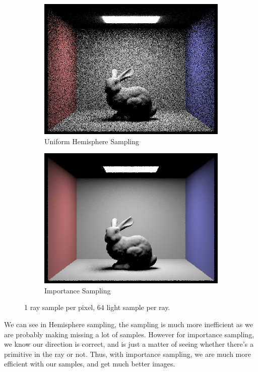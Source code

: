 \documentclass{article}
\begin{document}
\begin{figure}
\begin{subfigure}[h]{0.4\textwidth}
\includegraphics[width=\textwidth]{task3/CBbunny_1_64_h.png}
\caption{Uniform Hemisphere Sampling}
\end{subfigure}
\hfill\vrule\hfill
\begin{subfigure}[h]{0.4\textwidth}
\includegraphics[width=\textwidth]{task3/CBbunny_1_64.png}
\caption{Importance Sampling}
\end{subfigure}%

\caption[f2]{1 ray sample per pixel, 64 light sample per ray.}
\end{figure}
We can see in Hemisphere sampling, the sampling is much more inefficient as we are probably making missing a lot of samples. However for importance sampling, we know our direction is correct, and is just a matter of seeing whether there's a primitive in the ray or not. Thus, with importance sampling, we are much more efficient with our samples, and get much better images.
\newpage
\end{document}
